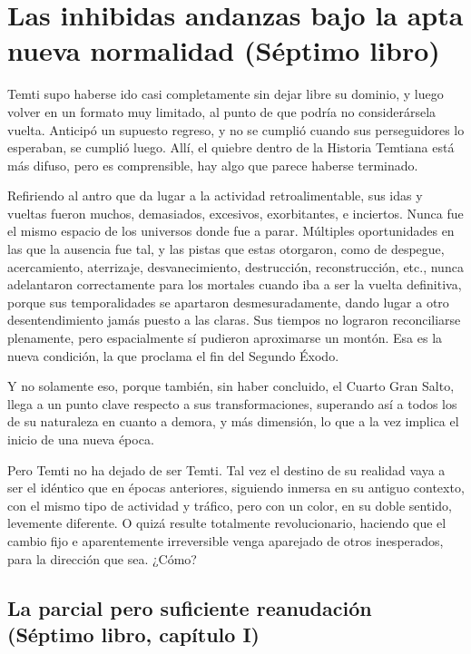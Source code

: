 \documentclass[
  spanish,
]{book}
\begin{document}
\hypertarget{las-inhibidas-andanzas-bajo-la-apta-nueva-normalidad-suxe9ptimo-libro}{%
\chapter{Las inhibidas andanzas bajo la apta nueva normalidad (Séptimo libro)}\label{las-inhibidas-andanzas-bajo-la-apta-nueva-normalidad-suxe9ptimo-libro}}

Temti supo haberse ido casi completamente sin dejar libre su dominio, y luego volver en un formato muy limitado, al punto de que podría no considerársela vuelta. Anticipó un supuesto regreso, y no se cumplió cuando sus perseguidores lo esperaban, se cumplió luego. Allí, el quiebre dentro de la Historia Temtiana está más difuso, pero es comprensible, hay algo que parece haberse terminado.

Refiriendo al antro que da lugar a la actividad retroalimentable, sus idas y vueltas fueron muchos, demasiados, excesivos, exorbitantes, e inciertos. Nunca fue el mismo espacio de los universos donde fue a parar. Múltiples oportunidades en las que la ausencia fue tal, y las pistas que estas otorgaron, como de despegue, acercamiento, aterrizaje, desvanecimiento, destrucción, reconstrucción, etc., nunca adelantaron correctamente para los mortales cuando iba a ser la vuelta definitiva, porque sus temporalidades se apartaron desmesuradamente, dando lugar a otro desentendimiento jamás puesto a las claras. Sus tiempos no lograron reconciliarse plenamente, pero espacialmente sí pudieron aproximarse un montón. Esa es la nueva condición, la que proclama el fin del Segundo Éxodo.

Y no solamente eso, porque también, sin haber concluido, el Cuarto Gran Salto, llega a un punto clave respecto a sus transformaciones, superando así a todos los de su naturaleza en cuanto a demora, y más dimensión, lo que a la vez implica el inicio de una nueva época.

Pero Temti no ha dejado de ser Temti. Tal vez el destino de su realidad vaya a ser el idéntico que en épocas anteriores, siguiendo inmersa en su antiguo contexto, con el mismo tipo de actividad y tráfico, pero con un color, en su doble sentido, levemente diferente. O quizá resulte totalmente revolucionario, haciendo que el cambio fijo e aparentemente irreversible venga aparejado de otros inesperados, para la dirección que sea. ¿Cómo?

\hypertarget{la-parcial-pero-suficiente-reanudaciuxf3n-suxe9ptimo-libro-capuxedtulo-i}{%
\section{La parcial pero suficiente reanudación (Séptimo libro, capítulo I)}\label{la-parcial-pero-suficiente-reanudaciuxf3n-suxe9ptimo-libro-capuxedtulo-i}}
\end{document}
